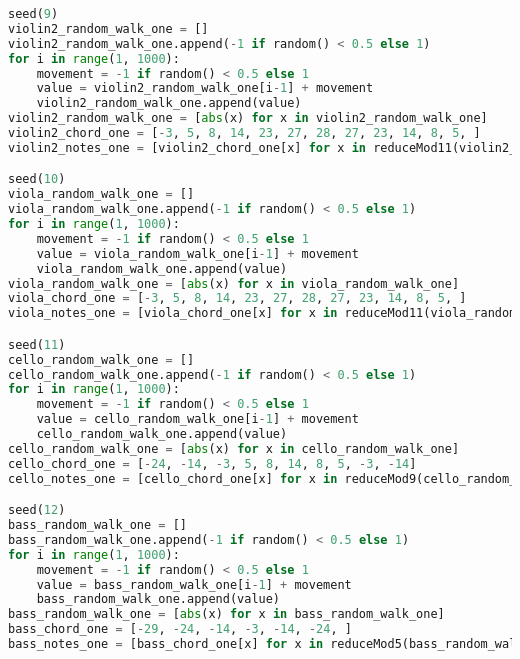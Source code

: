 \begin{lstlisting}[language=Python, caption=Tianshu Segment\_I]
seed(9)
violin2_random_walk_one = []
violin2_random_walk_one.append(-1 if random() < 0.5 else 1)
for i in range(1, 1000):
    movement = -1 if random() < 0.5 else 1
    value = violin2_random_walk_one[i-1] + movement
    violin2_random_walk_one.append(value)
violin2_random_walk_one = [abs(x) for x in violin2_random_walk_one]
violin2_chord_one = [-3, 5, 8, 14, 23, 27, 28, 27, 23, 14, 8, 5, ]
violin2_notes_one = [violin2_chord_one[x] for x in reduceMod11(violin2_random_walk_one)]

seed(10)
viola_random_walk_one = []
viola_random_walk_one.append(-1 if random() < 0.5 else 1)
for i in range(1, 1000):
    movement = -1 if random() < 0.5 else 1
    value = viola_random_walk_one[i-1] + movement
    viola_random_walk_one.append(value)
viola_random_walk_one = [abs(x) for x in viola_random_walk_one]
viola_chord_one = [-3, 5, 8, 14, 23, 27, 28, 27, 23, 14, 8, 5, ]
viola_notes_one = [viola_chord_one[x] for x in reduceMod11(viola_random_walk_one)]

seed(11)
cello_random_walk_one = []
cello_random_walk_one.append(-1 if random() < 0.5 else 1)
for i in range(1, 1000):
    movement = -1 if random() < 0.5 else 1
    value = cello_random_walk_one[i-1] + movement
    cello_random_walk_one.append(value)
cello_random_walk_one = [abs(x) for x in cello_random_walk_one]
cello_chord_one = [-24, -14, -3, 5, 8, 14, 8, 5, -3, -14]
cello_notes_one = [cello_chord_one[x] for x in reduceMod9(cello_random_walk_one)]

seed(12)
bass_random_walk_one = []
bass_random_walk_one.append(-1 if random() < 0.5 else 1)
for i in range(1, 1000):
    movement = -1 if random() < 0.5 else 1
    value = bass_random_walk_one[i-1] + movement
    bass_random_walk_one.append(value)
bass_random_walk_one = [abs(x) for x in bass_random_walk_one]
bass_chord_one = [-29, -24, -14, -3, -14, -24, ]
bass_notes_one = [bass_chord_one[x] for x in reduceMod5(bass_random_walk_one)]


\end{lstlisting}
